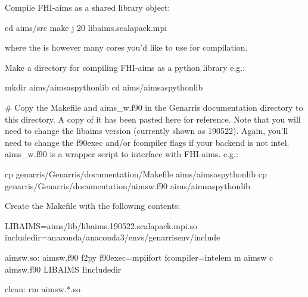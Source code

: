 \documentclass[letterpaper,10pt,english]{sphinxmanual}
\begin{document}
Compile FHI-aims as a shared library object:

\begin{sphinxVerbatim}[commandchars=\\\{\}]
cd \PYGZdl{}aims/src
make \PYGZhy{}j 20 libaims.scalapack.mpi
\end{sphinxVerbatim}

where the  is however many cores you'd like to use for compilation.

Make a directory for compiling FHI-aims as a python library
e.g.:

\begin{sphinxVerbatim}[commandchars=\\\{\}]
mkdir \PYGZdl{}aims/aims\PYGZus{}as\PYGZus{}python\PYGZus{}lib
cd \PYGZdl{}aims/aims\PYGZus{}as\PYGZus{}python\PYGZus{}lib
\end{sphinxVerbatim}

\# Copy the Makefile and aims\_w.f90 in the Genarris documentation directory to this directory. A copy of it has been pasted here for reference. Note that you will need to change the libaims version (currently shown as 190522). Again, you'll need to change the f90exec and/or fcompiler flags if your backend is not intel. aims\_w.f90 is a wrapper script to interface with FHI-aims.
e.g.:

\begin{sphinxVerbatim}[commandchars=\\\{\}]
cp \PYGZdl{}genarris/Genarris/documentation/Makefile \PYGZdl{}aims/aims\PYGZus{}as\PYGZus{}python\PYGZus{}lib
cp \PYGZdl{}genarris/Genarris/documentation/aims\PYGZus{}w.f90 \PYGZdl{}aims/aims\PYGZus{}as\PYGZus{}python\PYGZus{}lib
\end{sphinxVerbatim}

Create the Makefile with the following contents:

\begin{sphinxVerbatim}[commandchars=\\\{\}]
LIBAIMS=\PYGZdl{}\PYGZob{}aims\PYGZcb{}/lib/libaims.190522.scalapack.mpi.so
include\PYGZus{}dir=\PYGZdl{}\PYGZob{}anaconda\PYGZcb{}/anaconda3/envs/genarris\PYGZus{}env/include

aims\PYGZus{}w.so: aims\PYGZus{}w.f90
    f2py \PYGZhy{}\PYGZhy{}f90exec=mpiifort \PYGZhy{}\PYGZhy{}fcompiler=intelem \PYGZhy{}m aims\PYGZus{}w \PYGZbs{}
         \PYGZhy{}c aims\PYGZus{}w.f90 \PYGZdl{}\PYGZob{}LIBAIMS\PYGZcb{} \PYGZhy{}I\PYGZdl{}\PYGZob{}include\PYGZus{}dir\PYGZcb{}

clean:
    rm aims\PYGZus{}w.*.so
\end{sphinxVerbatim}
\end{document}
